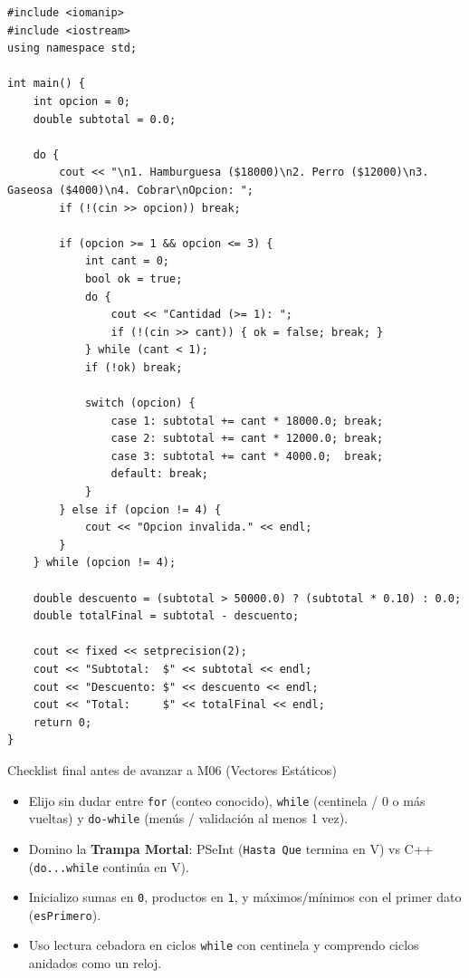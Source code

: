 \documentclass[11pt,letterpaper]{article}
\begin{document}
\begin{lstlisting}[style=cppmonitoria,caption={Solución Ejercicio 16: Facturación de restaurante (C++)}]
#include <iomanip>
#include <iostream>
using namespace std;

int main() {
    int opcion = 0;
    double subtotal = 0.0;

    do {
        cout << "\n1. Hamburguesa ($18000)\n2. Perro ($12000)\n3. Gaseosa ($4000)\n4. Cobrar\nOpcion: ";
        if (!(cin >> opcion)) break;

        if (opcion >= 1 && opcion <= 3) {
            int cant = 0;
            bool ok = true;
            do {
                cout << "Cantidad (>= 1): ";
                if (!(cin >> cant)) { ok = false; break; }
            } while (cant < 1);
            if (!ok) break;

            switch (opcion) {
                case 1: subtotal += cant * 18000.0; break;
                case 2: subtotal += cant * 12000.0; break;
                case 3: subtotal += cant * 4000.0;  break;
                default: break;
            }
        } else if (opcion != 4) {
            cout << "Opcion invalida." << endl;
        }
    } while (opcion != 4);

    double descuento = (subtotal > 50000.0) ? (subtotal * 0.10) : 0.0;
    double totalFinal = subtotal - descuento;

    cout << fixed << setprecision(2);
    cout << "Subtotal:  $" << subtotal << endl;
    cout << "Descuento: $" << descuento << endl;
    cout << "Total:     $" << totalFinal << endl;
    return 0;
}
\end{lstlisting}

\begin{consejo}{Checklist final antes de avanzar a M06 (Vectores Estáticos)}
\begin{itemize}
  \item[\faCheckSquare] Elijo sin dudar entre \texttt{for} (conteo conocido), \texttt{while} (centinela / 0 o más vueltas) y \texttt{do-while} (menús / validación al menos 1 vez).
  \item[\faCheckSquare] Domino la \textbf{Trampa Mortal}: PSeInt (\texttt{Hasta Que} termina en V) vs C++ (\texttt{do...while} continúa en V).
  \item[\faCheckSquare] Inicializo sumas en \texttt{0}, productos en \texttt{1}, y máximos/mínimos con el primer dato (\texttt{esPrimero}).
  \item[\faCheckSquare] Uso lectura cebadora en ciclos \texttt{while} con centinela y comprendo ciclos anidados como un reloj.
\end{itemize}
\end{consejo}
\end{document}
